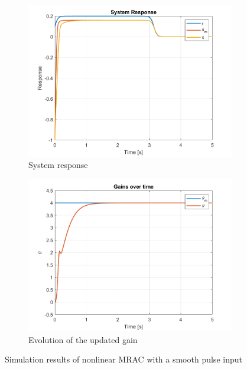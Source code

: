 \begin{figure}[!t]
 \centering
 \begin{subfigure}[b]{0.49\linewidth}
  \centering
  \includegraphics[width=\linewidth]{images/NL-MRAC-SIM/Smooth-Pulse/v2/NMRAC_First-Order_Response.png}
  \caption{System response}
  \label{fig:pulse}
 \end{subfigure}
 \hfill
 \begin{subfigure}[b]{0.49\linewidth}
  \centering
  \includegraphics[width=\linewidth]{images/NL-MRAC-SIM/Smooth-Pulse/v2/NMRAC_First-Order_Parameters.png}
  \caption{Evolution of the updated gain}
  \label{fig:pulse-weights}
 \end{subfigure}
 \caption{Simulation results of nonlinear MRAC with a smooth pulse input}
 \label{fig:nl-pulse}
\end{figure}


